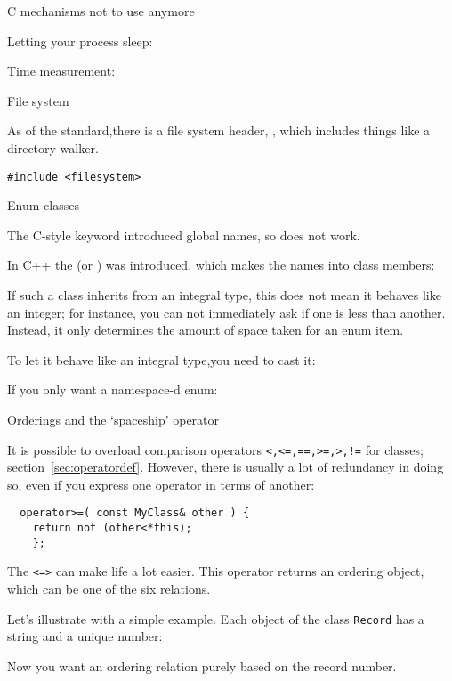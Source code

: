  {C mechanisms not to use anymore}

Letting your process sleep: 

Time measurement: 

 {File system}

As of the  standard,there is a file system header,
,
which includes things like a directory walker.
\begin{lstlisting}
#include <filesystem>
\end{lstlisting}

 {Enum classes}
\label{sec:enum-class}

The C-style  keyword introduced global names, so
does not work.

In C++ the 
(or )
was introduced, which makes the names into class members:

If such a class inherits from an integral type,
this does not mean it behaves like an integer;
for instance, you can not immediately ask if one is less than another.
Instead, it only determines the amount of space taken for an enum item.

To let it behave like an integral type,you need to cast it:

If you only want a namespace-d enum:

 {Orderings and the `spaceship' operator}

It is possible to overload comparison operators
\lstinline|<,<=,==,>=,>,!=|
for classes; section~\ref{sec:operatordef}.
However, there is usually a lot of redundancy in doing so,
even if you express one operator in terms of another:
\begin{lstlisting}
  operator>=( const MyClass& other ) {
    return not (other<*this);
    };
\end{lstlisting}

The  
\lstinline|<=>|
can make life a lot easier.
This operator returns an ordering object,
which can be one of the six relations.

Let's illustrate with a simple example.
Each object of the class \lstinline{Record}
has a string and a unique number:

Now you want an ordering relation purely based on the record number.

